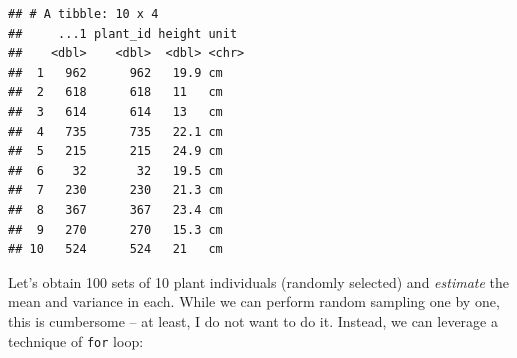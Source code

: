 \documentclass[
]{article}
\newenvironment{Shaded}{\begin{snugshade}}{\end{snugshade}}
\newcommand{\AttributeTok}[1]{\textcolor[rgb]{0.77,0.63,0.00}{#1}}
\newcommand{\CommentTok}[1]{\textcolor[rgb]{0.56,0.35,0.01}{\textit{#1}}}
\newcommand{\ConstantTok}[1]{\textcolor[rgb]{0.00,0.00,0.00}{#1}}
\newcommand{\ControlFlowTok}[1]{\textcolor[rgb]{0.13,0.29,0.53}{\textbf{#1}}}
\newcommand{\DecValTok}[1]{\textcolor[rgb]{0.00,0.00,0.81}{#1}}
\newcommand{\FunctionTok}[1]{\textcolor[rgb]{0.00,0.00,0.00}{#1}}
\newcommand{\NormalTok}[1]{#1}
\newcommand{\OtherTok}[1]{\textcolor[rgb]{0.56,0.35,0.01}{#1}}
\newcommand{\SpecialCharTok}[1]{\textcolor[rgb]{0.00,0.00,0.00}{#1}}
\begin{document}
\begin{verbatim}
## # A tibble: 10 x 4
##     ...1 plant_id height unit 
##    <dbl>    <dbl>  <dbl> <chr>
##  1   962      962   19.9 cm   
##  2   618      618   11   cm   
##  3   614      614   13   cm   
##  4   735      735   22.1 cm   
##  5   215      215   24.9 cm   
##  6    32       32   19.5 cm   
##  7   230      230   21.3 cm   
##  8   367      367   23.4 cm   
##  9   270      270   15.3 cm   
## 10   524      524   21   cm
\end{verbatim}

Let's obtain 100 sets of 10 plant individuals (randomly selected) and \emph{estimate} the mean and variance in each. While we can perform random sampling one by one, this is cumbersome -- at least, I do not want to do it. Instead, we can leverage a technique of \texttt{for} loop:

\begin{Shaded}
\end{Shaded}
\end{document}
